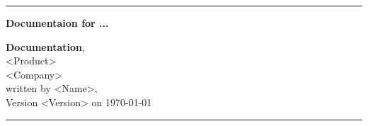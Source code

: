 \begin{titlepage}
\thispagestyle{empty}
    \hrule
    \vspace{1cm}
    \begin{center}
        {\huge\bf\sc Documentaion for ...}
    \end{center}
    \vfill
    \begin{Large}
        {\bf Documentation},\\[48pt]
        <Product>\\
        <Company>\\[72pt]
        written by <Name>,\\
        Version <Version> on \today
        \vfill
    \end{Large}
    \vspace{1cm}
    \hrule
\end{titlepage}


